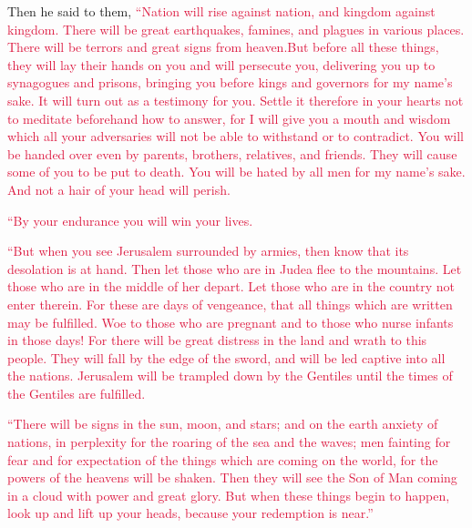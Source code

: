 \myverse{}Then he said to them, \textcolor{crimson}{“Nation will rise against nation, and kingdom against kingdom.} \myverse{}\textcolor{crimson}{There will be great earthquakes, famines, and plagues in various places. There will be terrors and great signs from heaven.}\myverse{}\textcolor{crimson}{But before all these things, they will lay their hands on you and will persecute you, delivering you up to synagogues and prisons, bringing you before kings and governors for my name’s sake.} \myverse{}\textcolor{crimson}{It will turn out as a testimony for you.} \myverse{}\textcolor{crimson}{Settle it therefore in your hearts not to meditate beforehand how to answer,}
\myverse{}\textcolor{crimson}{for I will give you a mouth and wisdom which all your adversaries will
	not be able to withstand or to contradict.
}
\myverse{}\textcolor{crimson}{You will be handed over even by parents, brothers, relatives, and friends.
	They will cause some of you to be put to death.
}
\myverse{}\textcolor{crimson}{You will be hated by all men for my name’s sake.
}
\myverse{}\textcolor{crimson}{And not a hair of your head will perish.}

\myverse{}\textcolor{crimson}{“By your endurance you will win your lives.}

\myverse{}\textcolor{crimson}{“But when you see Jerusalem surrounded by armies, then know
	that its desolation is at hand.
}
\myverse{}\textcolor{crimson}{Then let those who are in Judea flee to the mountains. Let those who
	are in the middle of her depart. Let those who are in the country not enter therein.
}
\myverse{}\textcolor{crimson}{For these are days of vengeance, that all things which are written may
	be fulfilled.
}
\myverse{}\textcolor{crimson}{Woe to those who are pregnant and to those who nurse infants in those
	days! For there will be great distress in the land and wrath to this people.
}
\myverse{}\textcolor{crimson}{They will fall by the edge of the sword, and will be led captive into
	all the nations. Jerusalem will be trampled down by the Gentiles until the times of the Gentiles are fulfilled.
}

\myverse{}\textcolor{crimson}{“There will be signs in the sun, moon, and stars; and on
	the earth anxiety of nations, in perplexity for the roaring of the sea and the waves;
}
\myverse{}\textcolor{crimson}{men fainting for fear and for expectation of the things which are coming
	on the world, for the powers of the heavens will be shaken.
}
\myverse{}\textcolor{crimson}{Then they will see the Son of Man coming in a cloud with power and great
	glory.
}
\myverse{}\textcolor{crimson}{But when these things begin to happen, look up and lift up your heads,
	because your redemption is near.”}

